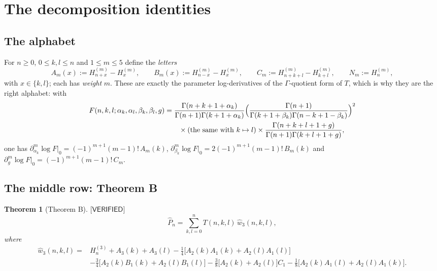 \documentclass[11pt,reqno]{amsart}
\theoremstyle{plain}
\newtheorem{theorem}{Theorem}[section]
\theoremstyle{definition}
\theoremstyle{remark}
\numberwithin{equation}{section}
\newcommand{\wthree}{\hat w_3}
\newcommand{\VERIFIED}{\textsf{[VERIFIED]}}
\begin{document}
\section{The decomposition identities}\label{sec:decomp}

\subsection{The alphabet}

For $n\ge0$, $0\le k,l\le n$ and $1\le m\le5$ define the \emph{letters}
\begin{equation}\label{eq:letters}
A_m(x):=H^{(m)}_{n+x}-H^{(m)}_{x},\qquad
B_m(x):=H^{(m)}_{n-x}-H^{(m)}_{x},\qquad
C_m:=H^{(m)}_{n+k+l}-H^{(m)}_{k+l},\qquad
N_m:=H^{(m)}_{n},
\end{equation}
with $x\in\{k,l\}$; each has \emph{weight} $m$. These are exactly the parameter
log-derivatives of the $\Gamma$-quotient form of $T$, which is why they are the right
alphabet: with
\[
\begin{aligned}
F(n,k,l;\alpha_k,\alpha_l,\beta_k,\beta_l,g)
&=\frac{\Gamma(n+k+1+\alpha_k)}{\Gamma(n+1)\Gamma(k+1+\alpha_k)}
\Bigl(\frac{\Gamma(n+1)}{\Gamma(k+1+\beta_k)\Gamma(n-k+1-\beta_k)}\Bigr)^{2}\\
&\qquad\times(\text{the same with } k\mapsto l)\times
\frac{\Gamma(n+k+l+1+g)}{\Gamma(n+1)\Gamma(k+l+1+g)},
\end{aligned}
\]
one has $\partial_{\alpha_k}^m\log F|_0=(-1)^{m+1}(m-1)!\,A_m(k)$,
$\partial_{\beta_k}^m\log F|_0=2(-1)^{m+1}(m-1)!\,B_m(k)$ and
$\partial_g^m\log F|_0=(-1)^{m+1}(m-1)!\,C_m$.

\subsection{The middle row: Theorem B}

\begin{theorem}[Theorem B]\label{thm:B}
$\VERIFIED$
\[
\hat P_n=\sum_{k,l=0}^{n}T(n,k,l)\,\wthree(n,k,l),
\]
where
\begin{equation}\label{eq:w3}
\begin{aligned}
\wthree(n,k,l)={}& H^{(3)}_n+A_3(k)+A_3(l)
-\tfrac14\bigl[A_2(k)A_1(k)+A_2(l)A_1(l)\bigr]\\
&-\tfrac34\bigl[A_2(k)B_1(k)+A_2(l)B_1(l)\bigr]
-\tfrac38\bigl[A_2(k)+A_2(l)\bigr]C_1
-\tfrac18\bigl[A_2(k)A_1(l)+A_2(l)A_1(k)\bigr].
\end{aligned}
\end{equation}
\end{theorem}
\end{document}
